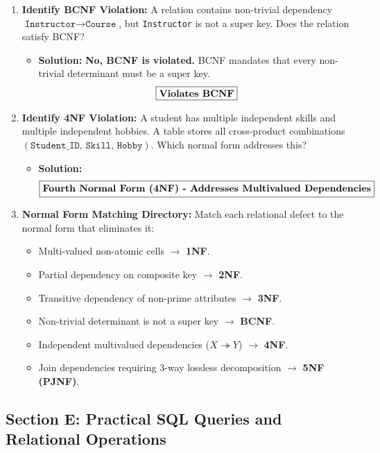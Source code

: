 \begin{enumerate}[label=\textbf{Problem \arabic*.,resume},leftmargin=1.5cm]
\item \textbf{Identify BCNF Violation:}
A relation contains non-trivial dependency $\texttt{Instructor} \rightarrow \texttt{Course}$, but \texttt{Instructor} is not a super key. Does the relation satisfy BCNF?
\begin{itemize}
\item \textbf{Solution:}
\textbf{No, BCNF is violated.} BCNF mandates that every non-trivial determinant must be a super key.
\[ \boxed{\text{\textbf{Violates BCNF}}} \]
\end{itemize}

\item \textbf{Identify 4NF Violation:}
A student has multiple independent skills and multiple independent hobbies. A table stores all cross-product combinations $(\texttt{Student\_ID, Skill, Hobby})$. Which normal form addresses this?
\begin{itemize}
\item \textbf{Solution:}
\[ \boxed{\text{\textbf{Fourth Normal Form (4NF) - Addresses Multivalued Dependencies}}} \]
\end{itemize}

\item \textbf{Normal Form Matching Directory:}
Match each relational defect to the normal form that eliminates it:
\begin{itemize}
\item Multi-valued non-atomic cells $\to$ \textbf{1NF}.
\item Partial dependency on composite key $\to$ \textbf{2NF}.
\item Transitive dependency of non-prime attributes $\to$ \textbf{3NF}.
\item Non-trivial determinant is not a super key $\to$ \textbf{BCNF}.
\item Independent multivalued dependencies ($X \twoheadrightarrow Y$) $\to$ \textbf{4NF}.
\item Join dependencies requiring 3-way lossless decomposition $\to$ \textbf{5NF (PJNF)}.
\end{itemize}
\end{enumerate}

\subsection{Section E: Practical SQL Queries and Relational Operations}

